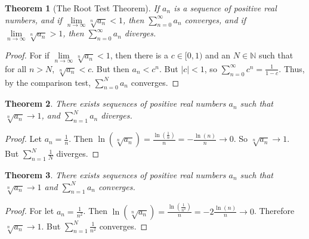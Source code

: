 \documentclass[oneside]{book}
\theoremstyle{mystyle}
\newtheorem*{theorem*}{Theorem}
\begin{document}
\begin{theorem*}[The Root Test Theorem]
If $a_n$ is a sequence of positive real numbers, and if $\underset{n\rightarrow \infty}\lim \sqrt[n]{a_n}<1$, then $\sum_{n=0}^{\infty} a_n$ converges, and if $\underset{n\rightarrow \infty}\lim \sqrt[n]{a_n} >1$, then $\sum_{n=0}^{\infty}a_n$ diverges.
\end{theorem*}
\begin{proof}
For if $\underset{n\rightarrow \infty}{\lim}\sqrt[n]{a_n}<1$, then there is a $c\in [0,1)$ and an $N\in \mathbb{N}$ such that for all $n>N$, $\sqrt[n]{a_n}<c$. But then $a_n< c^n$. But $|c|<1$, so $\sum_{n=0}^{\infty}c^n = \frac{1}{1-c}$. Thus, by the comparison test, $\sum_{n=0}^{N}a_n$ converges.
\end{proof}

\begin{theorem*}
There exists sequences of positive real numbers $a_n$ such that $\sqrt[n]{a_n} \rightarrow 1$, and $\sum_{n=1}^{N} a_n$ diverges.
\end{theorem*}

\begin{proof}
Let $a_n = \frac{1}{n}$. Then $\ln(\sqrt[n]{a_n}) = \frac{\ln(\frac{1}{n})}{n} = -\frac{\ln(n)}{n} \rightarrow 0$. So $\sqrt[n]{a_n} \rightarrow 1$. But $\sum_{n=1}^{N} \frac{1}{N}$ diverges.
\end{proof}

\begin{theorem*}
There exists sequences of positive real numbers $a_n$ such that $\sqrt[n]{a_n} \rightarrow 1$ and $\sum_{n=1}^{N}a_n$ converges.
\end{theorem*}
\begin{proof}
For let $a_n = \frac{1}{n^2}$. Then $\ln(\sqrt[n]{a_n}) = \frac{\ln(\frac{1}{n^2})}{n} = -2\frac{\ln(n)}{n} \rightarrow 0$. Therefore $\sqrt[n]{a_n}\rightarrow 1$. But $\sum_{n=1}^{N}\frac{1}{n^2}$ converges.
\end{proof}
\end{document}

